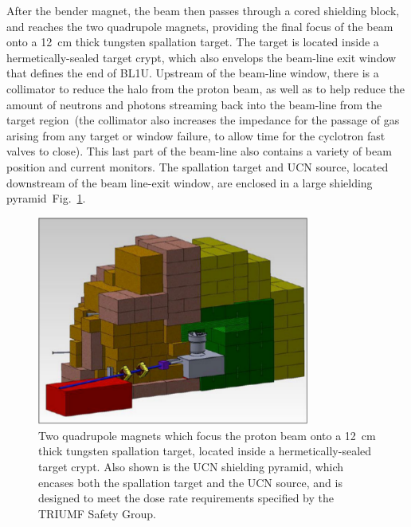 After the bender magnet, the beam then passes through a cored
shielding block, and reaches the two quadrupole magnets, providing the
final focus of the beam onto a 12~cm thick tungsten spallation target.
The target is located inside a hermetically-sealed target crypt, which
also envelops the beam-line exit window that defines the end of BL1U.
Upstream of the beam-line window, there is a collimator to reduce the
halo from the proton beam, as well as to help reduce the amount of
neutrons and photons streaming back into the beam-line from the target
region~(the collimator also increases the impedance for the passage of
gas arising from any target or window failure, to allow time for the
cyclotron fast valves to close). This last part of the beam-line also
contains a variety of beam position and current monitors. The
spallation target and UCN source, located downstream of the beam
line-exit window, are enclosed in a large shielding
pyramid~Fig.~\ref{fig:pyramid}.
\begin{figure}[h!]
  \centering
  \includegraphics[width=0.8\textwidth]{pyramid.png}
  \caption{Two quadrupole magnets which focus the proton beam onto a
    12~cm thick tungsten spallation target, located inside a
    hermetically-sealed target crypt. Also shown is the UCN shielding
    pyramid, which encases both the spallation target and the UCN
    source, and is designed to meet the dose rate requirements
    specified by the TRIUMF Safety Group.}
  \label{fig:pyramid}
\end{figure}


